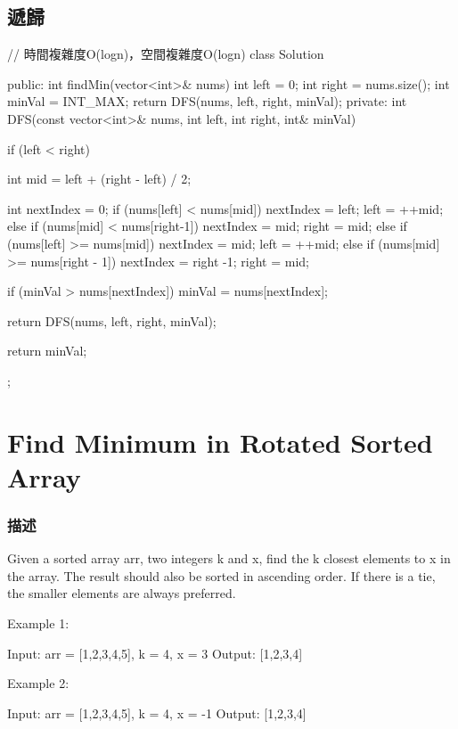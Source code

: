 \subsection{遞歸}
\begin{Code}
// 時間複雜度O(logn)，空間複雜度O(logn)
class Solution {
public:
    int findMin(vector<int>& nums) {
        int left = 0;
        int right = nums.size();
        int minVal = INT_MAX;
        return DFS(nums, left, right, minVal);
    }
private:
    int DFS(const vector<int>& nums, int left, int right, int& minVal) {
        if (left < right) {
            int mid = left + (right - left) / 2;

            int nextIndex = 0;
            if (nums[left] < nums[mid]) {
                nextIndex = left;
                left = ++mid;
            }
            else if (nums[mid] < nums[right-1]) {
                nextIndex = mid;
                right = mid;
            }
            else if (nums[left] >= nums[mid]) {
                nextIndex = mid;
                left = ++mid;
            }
            else if (nums[mid] >= nums[right - 1]) {
                nextIndex = right -1;
                right = mid;
            }

            if (minVal > nums[nextIndex])
                minVal = nums[nextIndex];

            return DFS(nums, left, right, minVal);
        }
        return minVal;
    }
};
\end{Code}

\section{Find Minimum in Rotated Sorted Array} %
\label{sec:find-minium-in-rotated-sorted-array}


\subsubsection{描述}
Given a sorted array arr, two integers k and x, find the k closest elements to x in the array. The result should also be sorted in ascending order. If there is a tie, the smaller elements are always preferred.

Example 1:
\begin{Code}
Input: arr = [1,2,3,4,5], k = 4, x = 3
Output: [1,2,3,4]
\end{Code}

Example 2:
\begin{Code}
Input: arr = [1,2,3,4,5], k = 4, x = -1
Output: [1,2,3,4]
\end{Code}

